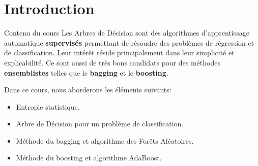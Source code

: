 \section[Introduction]{Introduction}

\begin{frame}{Contenu du cours}
	Les Arbres de Décision sont des algorithmes d'apprentissage automatique \textbf{supervisés} permettant de résoudre des problèmes de régression et de classification. Leur intérêt réside principalement dans leur simplicité et explicabilité. Ce sont aussi de très bons candidats pour des méthodes \textbf{ensemblistes} telles que le \textbf{bagging} et le \textbf{boosting}.
	
	\vspace{0.5cm}
	
	Dans ce cours, nous aborderons les éléments suivants:
	\begin{itemize}
		\pause
		\item Entropie statistique.
		\pause
		\item Arbre de Décision pour un problème de classification.
		\pause
		\item Méthode du bagging et algorithme des Forêts Aléatoires.
		\pause
		\item Méthode du boosting et algorithme AdaBoost.
	\end{itemize}
\end{frame}
